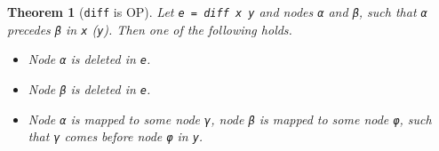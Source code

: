 \documentclass{sigplanconf}
\theoremstyle{plain}
\newtheorem{thm}{Theorem}
\begin{document}
%
\begin{thm}[\texttt{diff} is OP]
Let \texttt{e = diff x y} and nodes \texttt{α} and \texttt{β},
such that \texttt{α} precedes \texttt{β} in \texttt{x} (\texttt{y}).
Then one of the following holds.
\begin{itemize}
\item Node \texttt{α} is deleted in \texttt{e}.
\item Node \texttt{β} is deleted in \texttt{e}.
\item Node \texttt{α} is mapped to some node \texttt{γ}, node
  \texttt{β} is mapped to some node \texttt{φ}, such that
  \texttt{γ} comes before node \texttt{φ} in \texttt{y}.
\end{itemize}
\end{thm}

\end{document}
